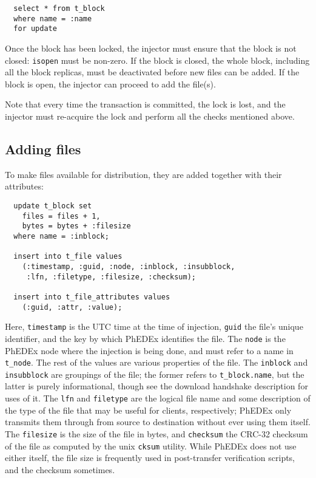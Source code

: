 \documentclass{cmspaper}
\begin{document}
{\small\begin{verbatim}
  select * from t_block
  where name = :name
  for update
\end{verbatim}}

Once the block has been locked, the injector must ensure that the block is not closed: \texttt{isopen} must be non-zero.  If the block is closed, the whole block, including all the block replicas, must be deactivated before new files can be added.  If the block is open, the injector can proceed to add the file(s).

Note that every time the transaction is committed, the lock is lost, and the injector must re-acquire the lock and perform all the checks mentioned above.

\subsection{Adding files}

To make files available for distribution, they are added together with their attributes:

{\small\begin{verbatim}
  update t_block set
    files = files + 1,
    bytes = bytes + :filesize
  where name = :inblock;

  insert into t_file values
    (:timestamp, :guid, :node, :inblock, :insubblock,
     :lfn, :filetype, :filesize, :checksum);

  insert into t_file_attributes values
    (:guid, :attr, :value);
\end{verbatim}}

Here, \texttt{timestamp} is the UTC time at the time of injection, \texttt{guid} the file's unique identifier, and the key by which PhEDEx identifies the file.  The \texttt{node} is the PhEDEx node where the injection is being done, and must refer to a name in \texttt{t\_node}.  The rest of the values are various properties of the file.  The \texttt{inblock} and \texttt{insubblock} are groupings of the file; the former refers to \texttt{t\_block.name}, but the latter is purely informational, though see the download handshake description for uses of it.  The \texttt{lfn} and \texttt{filetype} are the logical file name and some description of the type of the file that may be useful for clients, respectively; PhEDEx only transmits them through from source to destination without ever using them itself.  The \texttt{filesize} is the size of the file in bytes, and \texttt{checksum} the CRC-32 checksum of the file as computed by the unix \texttt{cksum} utility.  While PhEDEx does not use either itself, the file size is frequently used in post-transfer verification scripts, and the checksum sometimes.
\end{document}
